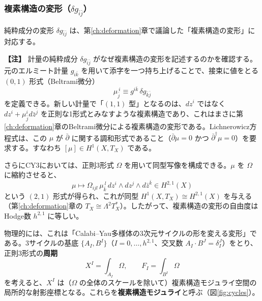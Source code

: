 \documentclass[uplatex, dvipdfmx, book]{jsbook}
\let\origsubsubsection\subsubsection
\renewcommand{\subsection}{\origsubsubsection}
\renewcommand{\subsubsection}{\paragraph}
\newenvironment{note}{\vspace{1ex}\par\footnotesize\noindent\textbf{【注】}}{\par\vspace{1ex}}
\begin{document}
\subsection{複素構造の変形（$\delta g_{\bar{i}\bar{j}}$）}

純粋成分の変形 $\delta g_{\bar{i}\bar{j}}$ は、第\ref{ch:deformation}章で議論した「複素構造の変形」に対応する。

\begin{note}
計量の純粋成分 $\delta g_{\bar{i}\bar{j}}$ がなぜ複素構造の変形を記述するのかを確認する。元のエルミート計量 $g_{i\bar{k}}$ を用いて添字を一つ持ち上げることで、接束に値をとる $(0,1)$ 形式（Beltrami微分）
\begin{equation*}
    \mu^{\ i}_{\bar{j}} \equiv g^{i\bar{k}}\, \delta g_{\bar{k}\bar{j}}
\end{equation*}
を定義できる。新しい計量で「$(1,1)$ 型」となるのは、$dz^i$ ではなく $dz^i + \mu^i_{\bar j}d\bar z^{\bar j}$ を正則な1形式とみなすような複素構造であり、これはまさに第\ref{ch:deformation}章のBeltrami微分による複素構造の変形である。Lichnerowicz方程式は、この $\mu$ が $\bar{\partial}$ に関する調和形式であること（$\bar{\partial} \mu = 0$ かつ $\bar{\partial}^\dagger \mu = 0$）を要求する。すなわち $[\mu] \in H^1(X, T_X)$ である。

さらにCY3においては、正則3形式 $\Omega$ を用いて同型写像を構成できる。$\mu$ を $\Omega$ に縮約させると、
\begin{equation*}
    \mu \mapsto \Omega_{ijl}\, \mu^{\ l}_{\bar{k}}\, dz^i \wedge dz^j \wedge d\bar{z}^{\bar{k}} \in H^{2,1}(X)
\end{equation*}
という $(2,1)$ 形式が得られ、これが同型 $H^1(X, T_X) \cong H^{2,1}(X)$ を与える（第\ref{ch:deformation}章の $T_X \cong \Lambda^{2}T^*_X$）。したがって、複素構造の変形の自由度はHodge数 $h^{2,1}$ に等しい。
\end{note}

物理的には、これは「Calabi--Yau多様体の3次元サイクルの形を変える変形」である。3サイクルの基底 $\{A_I, B^I\}$（$I = 0, \dots, h^{2,1}$、交叉数 $A_I \cdot B^J = \delta_I^J$）をとり、正則3形式の\textbf{周期}
\begin{equation}
    X^I = \int_{A_I}\Omega, \qquad F_I = \int_{B^I}\Omega
\end{equation}
を考えると、$X^I$ は（$\Omega$ の全体のスケールを除いて）複素構造モジュライ空間の局所的な射影座標となる。これらを\textbf{複素構造モジュライ}と呼ぶ（図\ref{fig:cycles}）。
\end{document}
